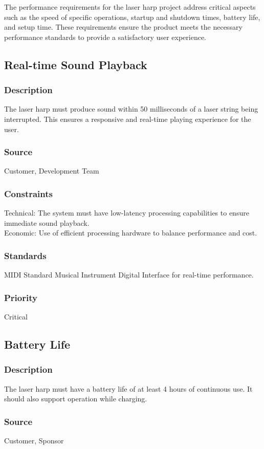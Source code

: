 The performance requirements for the laser harp project address critical aspects such as the speed of specific operations, startup and shutdown times, battery life, and setup time. These requirements ensure the product meets the necessary performance standards to provide a satisfactory user experience.

\subsection{Real-time Sound Playback}
\subsubsection{Description}
The laser harp must produce sound within 50 milliseconds of a laser string being interrupted. This ensures a responsive and real-time playing experience for the user.
\subsubsection{Source}
Customer, Development Team
\subsubsection{Constraints}
Technical: The system must have low-latency processing capabilities to ensure immediate sound playback.\\
Economic: Use of efficient processing hardware to balance performance and cost.
\subsubsection{Standards}
MIDI Standard Musical Instrument Digital Interface for real-time performance.
\subsubsection{Priority}
Critical


\subsection{Battery Life}
\subsubsection{Description}
The laser harp must have a battery life of at least 4 hours of continuous use. It should also support operation while charging.
\subsubsection{Source}
Customer, Sponsor
